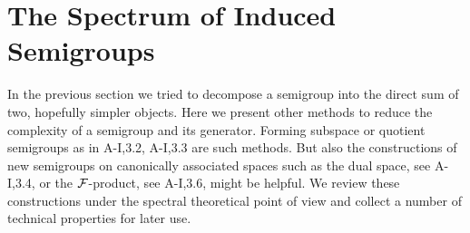 \section{The Spectrum of Induced Semigroups}\label{sec:a3-4}%
In the previous section we tried to decompose a semigroup into the direct sum of two, hopefully simpler objects.
Here we present other methods to reduce the complexity of a semigroup and its generator.
Forming subspace or quotient semigroups as in A-I,3.2, A-I,3.3 are such methods.
But also the constructions of new semigroups on canonically associated spaces such as the dual space, see A-I,3.4, or the $\mathcal{F}$-product, see A-I,3.6, might be helpful.
We review these constructions under the spectral theoretical point of view and collect a number of technical properties for later use.


